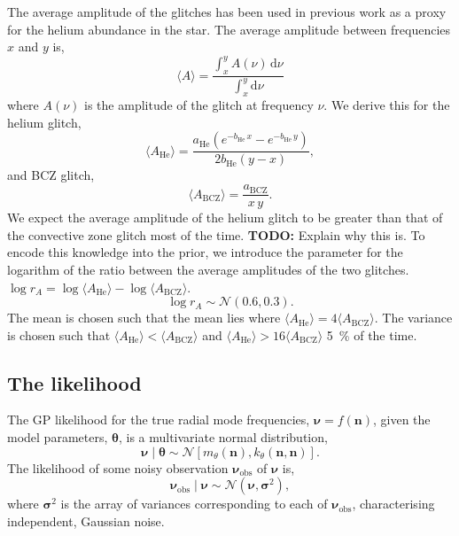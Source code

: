 \documentclass[linenumbers,modern,astrosymb,times]{aastex631}
\newcommand{\helium}{\mathrm{He}}
\newcommand{\bcz}{\mathrm{BCZ}}
\newcommand{\dd}{\mathrm{d}}
\newcommand{\todo}[1]{{\color{todo} \textbf{TODO:} #1}}
\begin{document}
The average amplitude of the glitches has been used in previous work as a proxy
for the helium abundance in the star. The average amplitude between frequencies
\(x\) and \(y\) is,
%
\begin{equation}
    \langle A \rangle = \frac{
        \int_{x}^{y} A(\nu) \, \dd \nu
    }{
        \int_{x}^{y} \dd \nu
    }
\end{equation}
%
where \(A(\nu)\) is the amplitude of the glitch at frequency \(\nu\). We derive
this for the helium glitch,
%
\begin{equation}
    \langle A_\helium \rangle = \frac{
        a_\helium \left(
        e^{- b_\helium \, x}
        - e^{- b_\helium \, y}
        \right)
    }{2 b_\helium (y - x)},
\end{equation}
%
and BCZ glitch,
%
\begin{equation}
    \langle A_\bcz \rangle
    = \frac{a_\bcz}{x \, y}.
\end{equation}
%
We expect the average amplitude of the helium glitch to be greater than that of
the convective zone glitch most of the time. \todo{Explain why this is.} To
encode this knowledge into the prior, we introduce the parameter for the
logarithm of the ratio between the average amplitudes of the two glitches.
\(\log r_A = \log \langle A_\helium \rangle - \log \langle A_\bcz \rangle\).
%
\begin{equation}
    \log r_A \sim \mathcal{N}(0.6, 0.3).
\end{equation}
%
The mean is chosen such that the mean lies where
\(\langle A_\helium \rangle = 4 \langle A_\bcz \rangle\). The variance is
chosen such that \(\langle A_\helium \rangle < \langle A_\bcz \rangle\) and
\(\langle A_\helium \rangle > 16 \langle A_\bcz \rangle\) \SI{5}{\percent} of
the time.

\subsection{The likelihood}

The GP likelihood for the true radial mode frequencies, \(\bm \nu = f(\bm n)\),
given the model parameters, \(\bm\theta\), is a multivariate normal distribution,
%
\begin{equation}
    \bm \nu \mid \bm\theta \sim
    \mathcal{N}\left[m_\theta(\bm n), k_\theta(\bm n, \bm n)\right].
\end{equation}
%
The likelihood of some noisy observation \(\bm \nu_\mathrm{obs}\) of
\(\bm \nu\) is,
%
\begin{equation}
    \bm\nu_\mathrm{obs} \mid \bm \nu
    \sim \mathcal{N}\left(\bm \nu, \bm\sigma^2\right),
\end{equation}
%
where \(\bm\sigma^2\) is the array of variances corresponding to
each of \(\bm\nu_\mathrm{obs}\), characterising independent, Gaussian noise.
\end{document}

